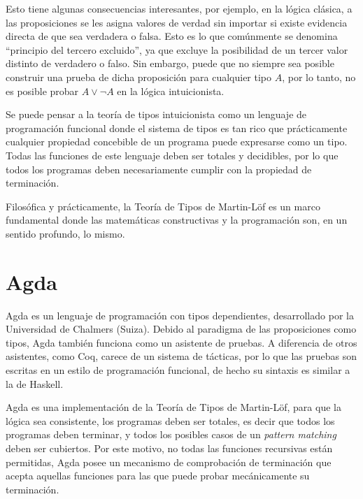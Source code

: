 Esto tiene algunas consecuencias interesantes, por ejemplo, en la lógica clásica, a las proposiciones se les asigna valores de verdad sin importar si existe evidencia directa de que sea verdadera o falsa.
Esto es lo que comúnmente se denomina ``principio del tercero excluido'', ya que excluye la posibilidad de un tercer valor distinto de verdadero o falso.
Sin embargo, puede que no siempre sea posible construir una prueba de dicha proposición para cualquier tipo $A$, por lo tanto, no es posible probar $A \vee \neg A$ en la lógica intuicionista.


Se puede pensar a la teoría de tipos intuicionista como un lenguaje de programación funcional donde el sistema de tipos es tan rico que prácticamente cualquier propiedad concebible de un programa puede expresarse como un tipo.
Todas las funciones de este lenguaje deben ser totales y decidibles, por lo que todos los programas deben necesariamente cumplir con la propiedad de terminación.

Filosófica y prácticamente, la Teoría de Tipos de Martin-Löf es un marco fundamental donde las matemáticas constructivas y la programación son, en un sentido profundo, lo mismo.


\section{Agda}
Agda es un lenguaje de programación con tipos dependientes, desarrollado por la Universidad de
Chalmers (Suiza).
Debido al paradigma de las proposiciones como tipos, Agda también funciona como un asistente de pruebas.
A diferencia de otros asistentes, como Coq, carece de un sistema de tácticas, por lo que las pruebas son escritas en un estilo de programación funcional, de hecho su sintaxis es similar a la de Haskell.

Agda es una implementación de la Teoría de Tipos de Martin-Löf, para que la lógica sea consistente, los programas deben ser totales, es decir que todos los programas deben terminar, y todos los posibles casos de un \textit{pattern matching} deben ser cubiertos.
Por este motivo, no todas las funciones recursivas están permitidas, Agda posee un mecanismo de comprobación de terminación que acepta aquellas funciones para las que puede probar mecánicamente su terminación.


